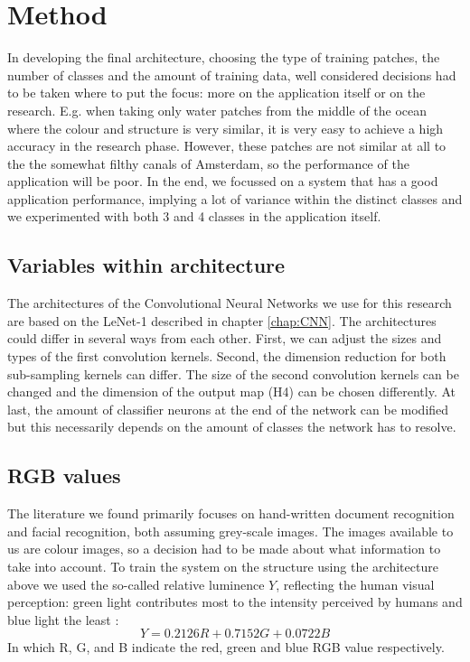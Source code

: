 \documentclass[a4paper,onecolumn]{report}
\begin{document}
\begin{small}
\begin{equation}
\end{equation}
\end{small}


\chapter{Method}
\label{chap:method}
In developing the final architecture, choosing the type of training patches, the number of classes and the amount of training data, well considered decisions had to be taken where to put the focus: more on the application itself or on the research. E.g. when taking only water patches from the middle of the ocean where the colour and structure is very similar, it is very easy to achieve a high accuracy in the research phase. However, these patches are not similar at all to the the somewhat filthy canals of Amsterdam, so the performance of the application will be poor. In the end, we focussed on a system that has a good application performance, implying a lot of variance within the distinct classes and we experimented with both 3 and 4 classes in the application itself. 

\section{Variables within architecture}
The architectures of the Convolutional Neural Networks we use for this research are based on the LeNet-1 described in chapter \ref{chap:CNN}. The architectures could differ in several ways from each other. First, we can adjust the sizes and types of the first convolution kernels. Second, the dimension reduction for both sub-sampling kernels can differ. The size of the second convolution kernels can be changed and the dimension of the output map (H4) can be chosen differently. At last, the amount of classifier neurons at the end of the network can be modified but this necessarily depends on the amount of classes the network has to resolve. 

\section{RGB values}
\label{sec:RGB}
The literature we found primarily focuses on hand-written document recognition and facial recognition, both assuming grey-scale images. The images available to us are colour images, so a decision had to be made about what information to take into account. To train the system on the structure using the architecture above we used the so-called relative luminence $Y$, reflecting the human visual perception: green light contributes most to the intensity perceived by humans and blue light the least \cite{stokes1996standard}:
\begin{equation}
Y=0.2126 R+0.7152 G+0.0722 B
\end{equation}
\noindent
In which R, G, and B indicate the red, green and blue RGB value respectively.\\
\end{document}
